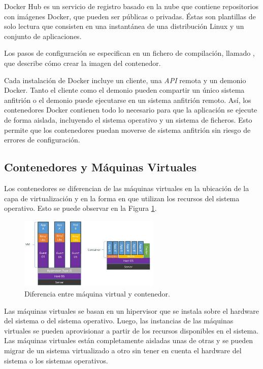 Docker Hub\cite{dockerhub} es un servicio de registro basado en la nube que contiene repositorios con imágenes Docker, que pueden ser públicas o privadas. Éstas son plantillas de solo lectura que consisten en una instantánea de una distribución Linux y un conjunto de aplicaciones.

Los pasos de configuración se especifican en un fichero de compilación, llamado , que describe cómo crear la imagen del contenedor.



Cada instalación de Docker incluye un cliente, una \textit{API} remota y un demonio Docker. Tanto el cliente como el demonio pueden compartir un único sistema anfitrión o el demonio puede ejecutarse en un sistema anfitrión remoto. Así, los contenedores Docker contienen todo lo necesario para que la aplicación se ejecute de forma aislada, incluyendo el sistema operativo y un sistema de ficheros. Esto permite que los contenedores puedan moverse de sistema anfitrión sin riesgo de errores de configuración.

\subsection{Contenedores y Máquinas Virtuales}

Los contenedores se diferencian de las máquinas virtuales en la ubicación de la capa de virtualización y en la forma en que utilizan los recursos del sistema operativo. Esto se puede observar en la Figura \ref{fig:containervsmv}.

\begin{figure}[H]
\centering
\includegraphics[width=0.6\textwidth]{images/figures/containervsmv.png}
\caption{Diferencia entre máquina virtual y contenedor.\footnotemark \label{fig:containervsmv}}
\end{figure}

Las máquinas virtuales se basan en un hipervisor que se instala sobre el hardware del sistema o del sistema operativo. Luego, las instancias de las máquinas virtuales se pueden aprovisionar a partir de los recursos disponibles en el sistema. Las máquinas virtuales están completamente aisladas unas de otras y se pueden migrar de un sistema virtualizado a otro sin tener en cuenta el hardware del sistema o los sistemas operativos.

